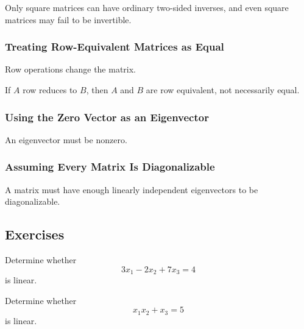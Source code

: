 Only square matrices can have ordinary two-sided inverses, and even square
matrices may fail to be invertible.

\subsubsection{Treating Row-Equivalent Matrices as Equal}
\label{subsec:error-row-equivalent-equal}

Row operations change the matrix.

If \(A\) row reduces to \(B\), then \(A\) and \(B\) are row equivalent, not
necessarily equal.

\subsubsection{Using the Zero Vector as an Eigenvector}
\label{subsec:error-zero-eigenvector}

An eigenvector must be nonzero.

\subsubsection{Assuming Every Matrix Is Diagonalizable}
\label{subsec:error-diagonalizable}

A matrix must have enough linearly independent eigenvectors to be
diagonalizable.

\subsection{Exercises}
\label{subsec:linear-algebra-exercises}

\begin{exercise}[1]
Determine whether
\[ 3x_1-2x_2+7x_3=4 \]
is linear.
\end{exercise}

\begin{exercise}[1]
Determine whether
\[ x_1x_2+x_3=5 \]
is linear.
\end{exercise}

